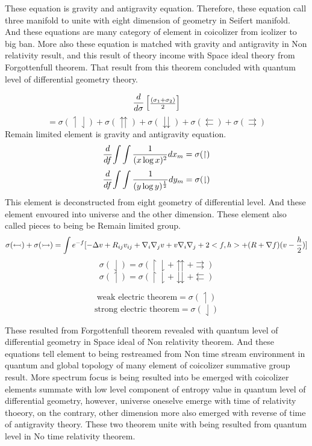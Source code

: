 \documentclass{jsarticle}
\begin{document}
  These equation is gravity and antigravity equation. 
  Therefore, these equation call three manifold to unite with eight dimension
  of geometry in Seifert manifold.
  And these equations are many category of element in coicolizer from
	   icolizer to big ban. More also these equation is matched with
	   gravity and antigravity in Non relativity result,
	   and this result of theory income with Space ideal theory from
	   Forgottenfull theorem.
	   That result from this theorem concluded with quantum level of
	   differential geometry theory.

	   $$ {d \over d\sigma}\begin{bmatrix}{(\sigma_1 + \sigma_2) 
	   \over 2}\end{bmatrix}  $$
	   $$ = \sigma(\upharpoonleft \downharpoonleft) + \sigma(
	   \upuparrows)+ \sigma(\downdownarrows)+ 
	   \sigma(\leftleftarrows)
	   + \sigma(\rightrightarrows) $$
	   Remain limited element is gravity and antigravity equation.
	   $$ {d \over df}{\int \int {1 \over (x \log x)^2}}dx_m
	   = \sigma(\upharpoonright) $$
	   $$ {d \over df}{\int \int {1 \over (y \log y)^{1 \over2}}}dy_m
	   = \sigma(\downharpoonright) $$
	   This element is deconstructed from eight geometry of differential
	   level. And these element envoured into universe and the other
	   dimension. These element also called pieces to being be Remain
	   limited group.
	   $$ \sigma(\leftarrowtail) + \sigma(\rightarrowtail)
	   = \int e^{-f}[-\Delta v + R_{ij}v_{ij} + \nabla_{i}\nabla_{j}v
	   + v\nabla_{i}\nabla_{j} + 2 <f,h> + (R + \nabla f)(v - 
	   {h \over 2})]
	   $$
	   $$ \sigma(\downharpoonleft) = \sigma(\upharpoonright 
	   \downharpoonright + \upuparrows 
	   + \rightrightarrows)$$
	   $$ \sigma(\upharpoonleft) =  \sigma(\upharpoonright 
	   \downharpoonright + \downdownarrows 
	   + \leftleftarrows) $$
         
	   $$ \text{weak electric theorem} = \sigma(\upharpoonleft) $$
	   $$ \text{strong electric theorem} = \sigma(\downharpoonleft) $$

	   These resulted from Forgottenfull theorem revealed with
	   quantum level of differential geometry in Space ideal of
	   Non relativity theorem.
	   And these equations tell element to being restreamed from
	   Non time stream environment in quantum and global topology 
	   of many element of coicolizer summative group result.
	   More spectrum focus is being resulted into be emerged with
	   coicolizer elements summate with low level component of
           entropy value in quantum level of differential geometry,
	   however, universe oneselve emerge with time of relativity thoeory,
	   on the contrary, other dimension more also emerged with reverse
	   of time of antigravity theory.
	   These two theorem unite with being resulted from quantum level
	   in No time relativity theorem.
\end{document}
